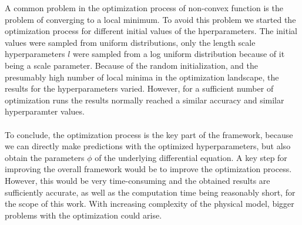 \documentclass{article}
\begin{document}
A common problem in the optimization process of non-convex function is the problem of converging to a local minimum. To avoid this problem we started the optimization process for different initial values of the hperparameters. The initial values were sampled from uniform distributions, only the length scale hyperparameters $l$ were sampled from a log uniform distribution because of it being a scale parameter. Because of the random initialization, and the presumably high number of local minima in the optimization landscape, the results for the hyperparameters varied. However, for a sufficient number of optimization runs the results normally reached a similar accuracy and similar hyperparamter values. \\
\\
To conclude, the optimization process is the key part of the framework, because we can directly make predictions with the optimized hyperparameters, but also obtain the parameters $\phi$ of the underlying differential equation. A key step for improving the overall framework would be to improve the optimization process. However, this would be very time-consuming and the obtained results are sufficiently accurate, as well as the computation time being reasonably short, for the scope of this work. With increasing complexity of the physical model, bigger problems with the optimization could arise.\\
\end{document}
